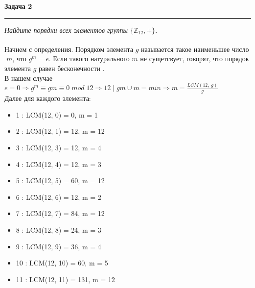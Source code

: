 \documentclass[a4paper,11pt]{article}
\begin{document}
\textbf{\large Задача 2}
\medskip\hrule\medskip
\textit{Найдите порядки всех элементов группы $ \{\mathbb{Z}_{12}, +\} $}. \\ \\
Начнем с определения.  Порядком элемента $ g $ называется такое наименьшее число$\; m $, что $ g^m = e $. Если такого натурального $ m $ не сущетсвует, говорят, что порядок элемента $ g $ равен бесконечности . \\[2pt]
В нашем случае $ e = 0  \Rightarrow g^m \equiv gm \equiv 0 \; mod \; 12 \Rightarrow 12 \; | \;  gm \cup m = min \Rightarrow m = \frac{LCM(12, \; g)}{g}$ \\[2pt]
Далее для каждого элемента:
\begin{itemize}
\item 1 : LCM(12, 0) = 0, m = 1  
\item 2 : LCM(12, 1) = 12, m = 12 
\item 3 : LCM(12, 3) = 12, m = 4  
\item 4 : LCM(12, 4) = 12, m = 3 
\item 5 : LCM(12, 5) = 60, m = 12  
\item 6 : LCM(12, 6) = 12, m = 2 
\item 7 : LCM(12, 7) = 84, m = 12
\item 8 : LCM(12, 8) = 24, m = 3 
\item 9 : LCM(12, 9) = 36, m = 4 
\item 10 : LCM(12, 10) = 60, m = 5
\item 11 : LCM(12, 11) = 131, m = 12
\end{itemize}   
\newpage


\end{document}
